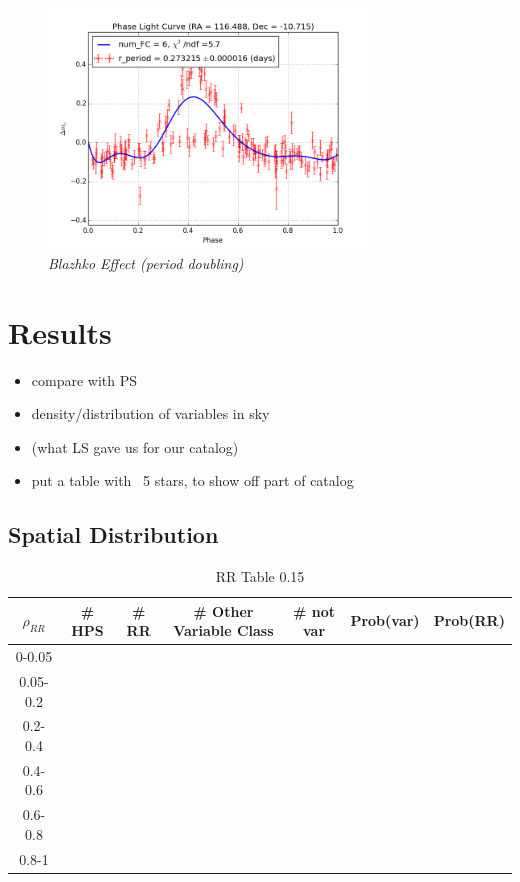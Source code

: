 \documentclass[aps,prb,twocolumn,superscriptaddress]{revtex4-1}
\begin{document}
	\begin{figure}[H]
	 \centering
	 	\includegraphics[width=3.35in]{figures/rPLCneg45E_limit2_grp_116-11_03117.png}
	 \caption{\it \small{Blazhko Effect (period doubling)}}
	 \label{fig:Blazhko}
	\end{figure}
\fi



\section{Results}
\begin{itemize}
	\item{} compare with PS~\cite{PSdata}
	\item{} density/distribution of variables in sky
	\item{} (what LS gave us for our catalog)
	\item{} put a table with ~5 stars, to show off part of catalog
\end{itemize}

\subsection{Spatial Distribution}
\iffalse
	\begin{table}[H]
	\begin{center}
		\begin{tabular}{ | c | c | c | c | c | c | c | }\hline
		$\rho_{RR}$ & \# HPS & \# RR & \# Other Variable Class & \# not var & Prob(var) & Prob(RR) \\ \hline
		0-0.05 &&&&&& \\ \hline
		0.05-0.2 &&&&&& \\ \hline
		0.2-0.4 &&&&&& \\ \hline
		0.4-0.6 &&&&&& \\ \hline
		0.6-0.8 &&&&&& \\ \hline
		0.8-1 &&&&&& \\ \hline
		\end{tabular}
	\end{center}
	\caption{ \small{RR Table 0.15 \label{tab:rrtab}}}
	\end{table}
\end{document}
